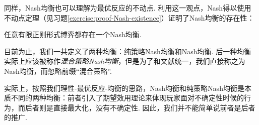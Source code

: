 同样，Nash均衡也可以理解为最优反应的不动点. 利用这一观点，Nash得以使用不动点定理（见习题\ref{exercise:proof-Nash-existence}）证明了Nash均衡的存在性：
\begin{theorem}\label{theorem:Nash-existence}
任意有限正则形式博弈都存在一个Nash均衡.
\end{theorem}

\begin{remark}
    目前为止，我们一共定义了两种均衡：纯策略Nash均衡和Nash均衡. 后一种均衡实际上应该被称作\textit{混合策略Nash均衡}，但是为了和文献统一，我们直接称之为Nash均衡，而忽略前缀“混合策略”.

    实际上，按照我们理性-最优反应-均衡的思路，Nash均衡和纯策略Nash均衡是本质不同的两种均衡：前者引入了期望效用理论来体现玩家面对不确定性时候的行为，而后者则是直接最大化，没有不确定性. 因此，我们并不能简单说前者是后者的推广. 
\end{remark}


